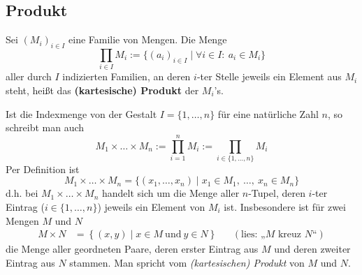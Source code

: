 \subsection*{Produkt}


\begin{de}  
    Sei $(M_i)_{i\in I}$ eine Familie von Mengen. Die Menge
        \[ \prod_{i\in I} M_i := \{ (a_i)_{i\in I} \mid \forall i\in I:\ a_i\in M_i \} \]
    aller durch $I$ indizierten Familien, an deren $i$-ter Stelle jeweils ein Element aus $M_i$ steht, heißt das \textbf{(kartesische) Produkt} der $M_i$'s.

    Ist die Indexmenge von der Gestalt $I=\{1,\dots , n\}$ für eine natürliche Zahl $n$, so schreibt man auch
        \[ M_1\times\ldots\times M_n := \prod_{i=1}^n M_i := \prod_{i\in \{1,\dots , n\}} M_i   \]
    Per Definition ist
        \[ M_1\times\ldots\times M_n = \{ (x_1,\dots , x_n) \mid x_1\in M_1,\ \ldots,\ x_n\in M_n \} \]
    d.h. bei $M_1\times\ldots\times M_n$ handelt sich um die Menge aller $n$-Tupel, deren $i$-ter Eintrag ($i\in \{1,\dots , n\}$) jeweils ein Element von $M_i$ ist.
    Insbesondere ist für zwei Mengen $M$ und $N$
    \begin{align*}
        M \times N & = \left\{ (x,y) \mid x\in M\ \text{und}\ y\in N \right\}  && (\text{lies: „$M$ kreuz $N$“})
    \end{align*}
    die Menge aller geordneten Paare, deren erster Eintrag aus $M$ und deren zweiter Eintrag aus $N$ stammen. Man spricht vom \emph{(kartesischen) Produkt} von $M$ und $N$.
\end{de}


